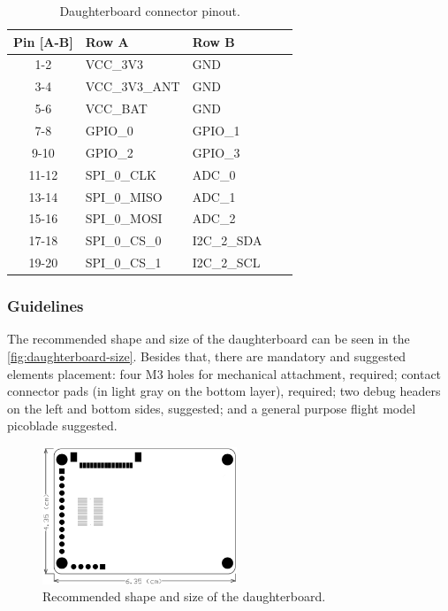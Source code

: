 \begin{table}[!ht]
    \centering
    \begin{tabular}{cllll}
        \toprule[1.5pt]
        \textbf{Pin [A-B]} & \textbf{Row A} & \textbf{Row B} \\
        \midrule
        1-2                & VCC\_3V3       & GND            \\
        3-4                & VCC\_3V3\_ANT  & GND            \\
        5-6                & VCC\_BAT       & GND            \\
        7-8                & GPIO\_0        & GPIO\_1        \\
        9-10               & GPIO\_2        & GPIO\_3        \\
        11-12              & SPI\_0\_CLK    & ADC\_0         \\
        13-14              & SPI\_0\_MISO   & ADC\_1         \\
        15-16              & SPI\_0\_MOSI   & ADC\_2         \\
        17-18              & SPI\_0\_CS\_0  & I2C\_2\_SDA    \\
        19-20              & SPI\_0\_CS\_1  & I2C\_2\_SCL    \\
        \bottomrule[1.5pt]
    \end{tabular}
    \caption{Daughterboard connector pinout.}
    \label{tab:daugtherboard-connector-pins}
\end{table}

\subsubsection{Guidelines}

The recommended shape and size of the daughterboard can be seen in the \autoref{fig:daughterboard-size}. Besides that, there are mandatory and suggested elements placement: four M3 holes for mechanical attachment, required; contact connector pads (in light gray on the bottom layer), required; two debug headers on the left and bottom sides, suggested; and a general purpose flight model picoblade suggested.

\begin{figure}[!ht]
    \begin{center}
        \includegraphics[width=0.52\textwidth]{figures/daughterboard-size.png}
        \caption{Recommended shape and size of the daughterboard.}
        \label{fig:daughterboard-size}
    \end{center}
\end{figure}

